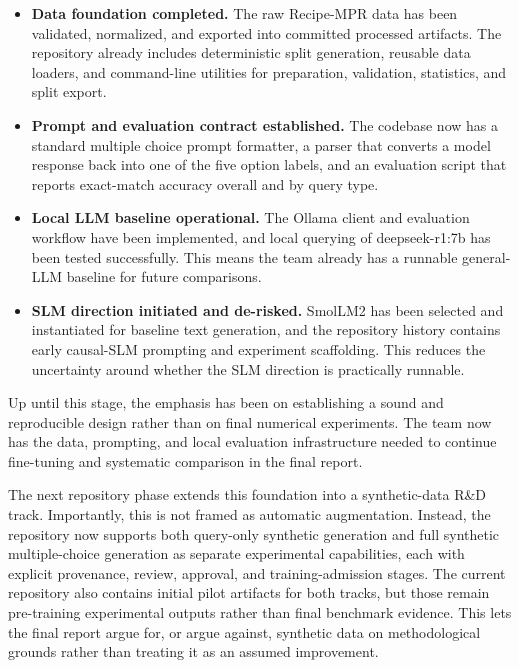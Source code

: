 \documentclass{article}
\begin{document}
\begin{itemize}
    \item \textbf{Data foundation completed.} The raw Recipe-MPR data has been validated, normalized, and exported into committed processed artifacts. The repository already includes deterministic split generation, reusable data loaders, and command-line utilities for preparation, validation, statistics, and split export.

    \item \textbf{Prompt and evaluation contract established.} The codebase now has a standard multiple choice prompt formatter, a parser that converts a model response back into one of the five option labels, and an evaluation script that reports exact-match accuracy overall and by query type.

    \item \textbf{Local LLM baseline operational.} The Ollama client and evaluation workflow have been implemented, and local querying of deepseek-r1:7b has been tested successfully. This means the team already has a runnable general-LLM baseline for future comparisons.

    \item \textbf{SLM direction initiated and de-risked.} SmolLM2 has been selected and instantiated for baseline text generation, and the repository history contains early causal-SLM prompting and experiment scaffolding. This reduces the uncertainty around whether the SLM direction is practically runnable.
\end{itemize}

Up until this stage, the emphasis has been on establishing a sound and reproducible design rather than on final numerical experiments. The team now has the data, prompting, and local evaluation infrastructure needed to continue fine-tuning and systematic comparison in the final report.

The next repository phase extends this foundation into a synthetic-data R\&D track. Importantly, this is not framed as automatic augmentation. Instead, the repository now supports both query-only synthetic generation and full synthetic multiple-choice generation as separate experimental capabilities, each with explicit provenance, review, approval, and training-admission stages. The current repository also contains initial pilot artifacts for both tracks, but those remain pre-training experimental outputs rather than final benchmark evidence. This lets the final report argue for, or argue against, synthetic data on methodological grounds rather than treating it as an assumed improvement.
\end{document}
